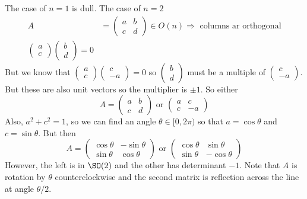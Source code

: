 \begin{ex}
The case of $n=1$ is dull. The case of $n=2$
	\[
	\begin{split}
	A&=
	\begin{pmatrix}
	a & b \\
	c & d
	\end{pmatrix} \in O(n) \Rightarrow \text{ columns ar orthogonal} \\
	\begin{pmatrix} a \\ c \end{pmatrix} \begin{pmatrix} b \\ d \end{pmatrix}=0
	\end{split}
	\]
But we know that $\begin{pmatrix} a \\ c \end{pmatrix} \begin{pmatrix} c \\ -a \end{pmatrix}=0$ so $\begin{pmatrix} b \\ d \end{pmatrix}$ must be a multiple of $\begin{pmatrix} c \\ -a \end{pmatrix}$. But these are also unit vectors so the multiplier is $\pm 1$. So either 
	\[
	A=
	\begin{pmatrix}
	a & b \\
	c & d
	\end{pmatrix} \text{ or }
	\begin{pmatrix}
	a & c \\
	c & -a
	\end{pmatrix}
	\]
Also, $a^2+c^2=1$, so we can find an angle $\theta \in [0,2\pi)$ so that $a= \cos \theta$ and $c= \sin \theta$. But then 
	\[
	A=
	\begin{pmatrix}
	\cos \theta & -\sin \theta \\
	\sin \theta & \cos \theta
	\end{pmatrix} \text{ or }
	\begin{pmatrix}
	\cos \theta & \sin \theta \\
	\sin \theta & -\cos \theta
	\end{pmatrix}
	\]
However, the left is in $\SO(2)$ and the other has determinant $-1$. Note that $A$ is rotation by $\theta$ counterclockwise and the second matrix is reflection across the line at angle $\theta/2$.
\end{ex}



